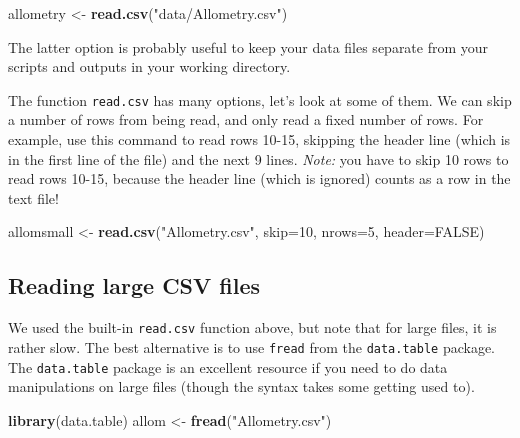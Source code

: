\documentclass[]{book}
\newenvironment{Shaded}{\begin{snugshade}}{\end{snugshade}}
\newcommand{\DataTypeTok}[1]{\textcolor[rgb]{0.13,0.29,0.53}{#1}}
\newcommand{\DecValTok}[1]{\textcolor[rgb]{0.00,0.00,0.81}{#1}}
\newcommand{\KeywordTok}[1]{\textcolor[rgb]{0.13,0.29,0.53}{\textbf{#1}}}
\newcommand{\NormalTok}[1]{#1}
\newcommand{\OtherTok}[1]{\textcolor[rgb]{0.56,0.35,0.01}{#1}}
\newcommand{\StringTok}[1]{\textcolor[rgb]{0.31,0.60,0.02}{#1}}
\begin{document}
\begin{Shaded}
\begin{Highlighting}[]
\NormalTok{allometry <-}\StringTok{ }\KeywordTok{read.csv}\NormalTok{(}\StringTok{"data/Allometry.csv"}\NormalTok{)}
\end{Highlighting}
\end{Shaded}

The latter option is probably useful to keep your data files separate from your scripts and outputs in your working directory.

The function \texttt{read.csv} has many options, let's look at some of them. We can skip a number of rows from being read, and only read a fixed number of rows. For example, use this command to read rows 10-15, skipping the header line (which is in the first line of the file) and the next 9 lines. \emph{Note:} you have to skip 10 rows to read rows 10-15, because the header line (which is ignored) counts as a row in the text file!

\begin{Shaded}
\begin{Highlighting}[]
\NormalTok{allomsmall <-}\StringTok{ }\KeywordTok{read.csv}\NormalTok{(}\StringTok{"Allometry.csv"}\NormalTok{, }\DataTypeTok{skip=}\DecValTok{10}\NormalTok{, }\DataTypeTok{nrows=}\DecValTok{5}\NormalTok{, }\DataTypeTok{header=}\OtherTok{FALSE}\NormalTok{)}
\end{Highlighting}
\end{Shaded}

\hypertarget{reading-large-csv-files}{%
\subsection{Reading large CSV files}\label{reading-large-csv-files}}

We used the built-in \texttt{read.csv} function above, but note that for large files, it is rather slow. The best alternative is to use \texttt{fread} from the \texttt{data.table} package. The \texttt{data.table} package is an excellent resource if you need to do data manipulations on large files (though the syntax takes some getting used to).

\begin{Shaded}
\begin{Highlighting}[]
\KeywordTok{library}\NormalTok{(data.table)}
\NormalTok{allom <-}\StringTok{ }\KeywordTok{fread}\NormalTok{(}\StringTok{"Allometry.csv"}\NormalTok{)}
\end{Highlighting}
\end{Shaded}
\end{document}
